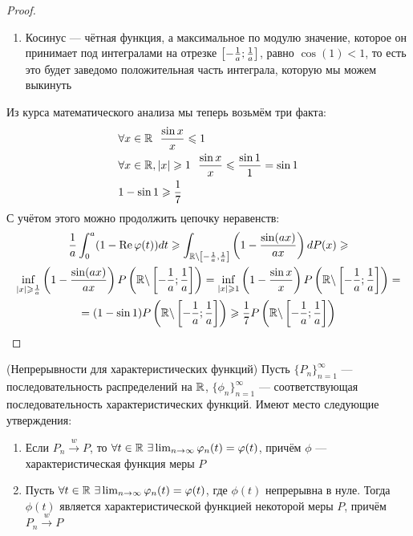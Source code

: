 \begin{proof}
\begin{enumerate}
    	\item Косинус --- чётная функция, а максимальное по модулю значение, которое он принимает под интегралами на отрезке $\left[-\frac{1}{a}; \frac{1}{a}\right]$, равно $\cos(1) < 1$, то есть это будет заведомо положительная часть интеграла, которую мы можем выкинуть
    \end{enumerate}
    Из курса математического анализа мы теперь возьмём три факта:
    \begin{align*}
        &{\forall x \in \mathbb{R}\ \ \frac{\sin x}{x} \leqslant 1}
        \\
        &{\forall x \in \mathbb{R}, |x| \geqslant 1\ \ \frac{\sin x}{x} \leqslant \frac{\sin 1}{1} = \sin 1}
        \\
        &{1 - \sin 1 \geqslant \frac{1}{7}}
    \end{align*}
    С учётом этого можно продолжить цепочку неравенств:
    \begin{multline*}
        \frac{1}{a} \int_0^a (1 - \operatorname{Re}\varphi(t))dt \geqslant \int_{\mathbb{R} \backslash \left[-\frac{1}{a}, \frac{1}{a}\right]} \left(1 - \frac{\sin(ax)}{ax}\right) dP(x) \geqslant
        \\
        \inf_{|x| \geqslant \frac{1}{a}} \left(1 - \frac{\sin(ax)}{ax}\right) P\left(\mathbb{R} \backslash \left[-\frac{1}{a}; \frac{1}{a}\right]\right) = \inf_{|x| \geqslant 1} \left(1 - \frac{\sin x}{x}\right) P\left(\mathbb{R} \backslash \left[-\frac{1}{a}; \frac{1}{a}\right]\right) =
        \\
        = (1 - \sin 1) P\left(\mathbb{R} \backslash \left[-\frac{1}{a}; \frac{1}{a}\right]\right) \geqslant \frac{1}{7} P\left(\mathbb{R} \backslash \left[-\frac{1}{a}; \frac{1}{a}\right]\right)
    \end{multline*}
\end{proof}

\begin{theorem} (Непрерывности для характеристических функций)
    Пусть $\{P_n\}_{n = 1}^\infty$ --- последовательность распределений на $\mathbb{R}$, $\{\phi_n\}_{n = 1}^\infty$ --- соответствующая последовательность характеристических функций. Имеют место следующие утверждения:
    \begin{enumerate}
        \item Если $P_n \xrightarrow{w} P$, то $\forall t \in \mathbb{R}\ \exists \lim_{n \to \infty} \varphi_n(t) = \varphi(t)$, причём $\phi$ --- характеристическая функция меры $P$
        \item Пусть $\forall t \in \mathbb{R}\ \exists \lim_{n \to \infty} \varphi_n(t) = \varphi(t)$, где $\phi(t)$ непрерывна в нуле. Тогда $\phi(t)$ является характеристической функцией некоторой меры $P$, причём $P_n \xrightarrow{w} P$
    \end{enumerate}
\end{theorem}

